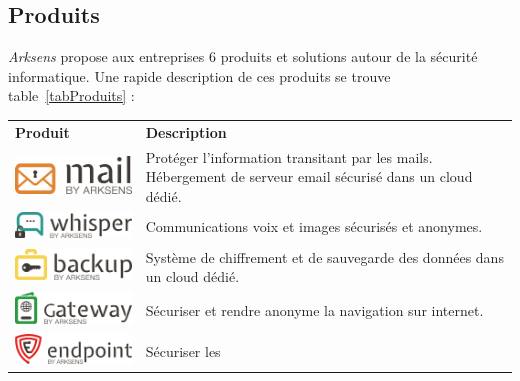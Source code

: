 \documentclass[a4paper,10pt, twoside]{report}
\begin{document}
\begin{spacing}{1.2}
\subsection{Produits}
\textit{Arksens} propose aux entreprises 6 produits et solutions autour de la
s\'ecurit\'e informatique. Une rapide description de ces produits se trouve
table~\ref{tabProduits} :
\begin{table}[h!]
  \centering
  \def\arraystretch{1.5}
  \setlength{\fboxsep}{13pt} %
  \setlength{\fboxrule}{0pt} %
  \begin{tabular}{m{6cm}m{6cm}}
   \rowcolor{arkred} 
    \arrayrulecolor{gray73}\hline
    \color{white} \textbf{Produit} & \color{white} \textbf{Description} \\
    \includegraphics[width=5cm, fbox]{produits/mail.png} & Prot\'eger l'information
    transitant par les mails. H\'ebergement de serveur email s\'ecuris\'e dans
    un cloud d\'edi\'e.\\
    \hline
    \includegraphics[width=5cm, fbox]{produits/whisper.png} & Communications voix
    et images s\'ecuris\'es et anonymes.\\
    \hline
    \includegraphics[width=5cm, fbox]{produits/backup.png} & Syst\`eme de
    chiffrement et de sauvegarde des donn\'ees dans un cloud d\'edi\'e.\\
    \hline
    \includegraphics[width=5cm, fbox]{produits/gateway.png} & S\'ecuriser et
    rendre anonyme la navigation sur internet.\\
    \hline
    \includegraphics[width=5cm, fbox]{produits/endpoint.png} & S\'ecuriser les

\end{tabular}
\end{table}
\end{spacing}
\end{document}
